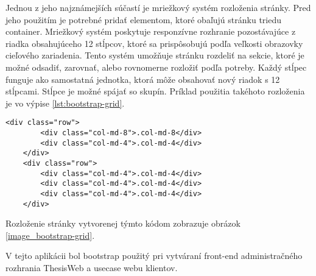 	Jednou z jeho najznámejších súčastí je mriežkový systém rozloženia stránky. Pred jeho použitím je potrebné pridať elementom, ktoré obaľujú stránku triedu container.	Mriežkový systém poskytuje responzívne rozhranie pozostávajúce z riadka obsahujúceho 12 stĺpcov, ktoré sa prispôsobujú podľa veľkosti obrazovky cieľového zariadenia. Tento systém umožňuje stránku rozdeliť na sekcie, ktoré je možné odsadiť, zarovnať, alebo rovnomerne rozložiť podľa potreby. Každý stĺpec funguje ako samostatná jednotka, ktorá môže obsahovať nový riadok s 12 stĺpcami. Stĺpce je možné spájať so skupín. Príklad použitia takéhoto rozloženia je vo výpise \ref{lst:bootstrap-grid}.
	\begin{lstlisting}[label=lst:bootstrap-grid,caption=Príklad použitia Bootstrap grid systému]
	<div class="row">
		<div class="col-md-8">.col-md-8</div>
		<div class="col-md-4">.col-md-4</div>
	</div>
	<div class="row">
		<div class="col-md-4">.col-md-4</div>
		<div class="col-md-4">.col-md-4</div>
		<div class="col-md-4">.col-md-4</div>
	</div>
	\end{lstlisting}
	
	Rozloženie stránky vytvorenej týmto kódom zobrazuje obrázok \ref{image_bootstrap-grid}.
		
			
	V tejto aplikácii bol bootstrap použitý pri vytváraní front-end administračného rozhrania ThesisWeb a usecase webu klientov.
	